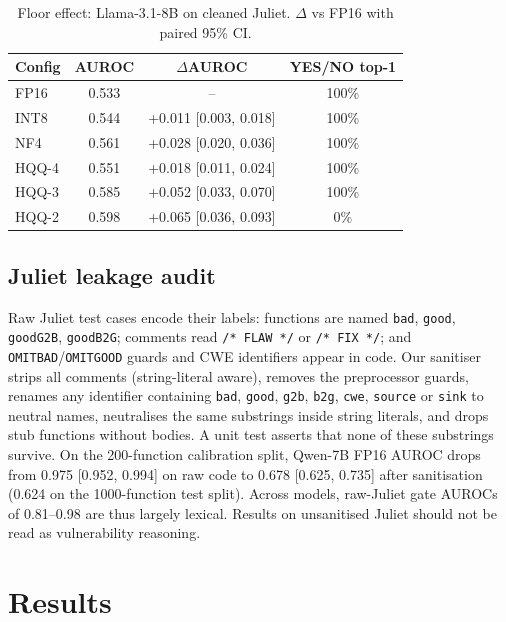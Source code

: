 \documentclass[conference]{IEEEtran}
\begin{document}
\begin{table}[t]
\centering
\caption{Floor effect: Llama-3.1-8B on cleaned Juliet. $\Delta$ vs FP16 with paired 95\% CI.}
\label{tab:floor}
\begin{tabular}{lccc}
\toprule
Config & AUROC & $\Delta$AUROC & YES/NO top-1 \\
\midrule
FP16  & 0.533 & -- & 100\% \\
INT8  & 0.544 & +0.011 [0.003, 0.018] & 100\% \\
NF4   & 0.561 & +0.028 [0.020, 0.036] & 100\% \\
HQQ-4 & 0.551 & +0.018 [0.011, 0.024] & 100\% \\
HQQ-3 & 0.585 & +0.052 [0.033, 0.070] & 100\% \\
HQQ-2 & 0.598 & +0.065 [0.036, 0.093] & 0\% \\
\bottomrule
\end{tabular}
\end{table}

\subsection{Juliet leakage audit}\label{sec:leak}
Raw Juliet test cases encode their labels: functions are named \texttt{bad}, \texttt{good}, \texttt{goodG2B}, \texttt{goodB2G}; comments read \texttt{/* FLAW */} or \texttt{/* FIX */}; and \texttt{OMITBAD}/\texttt{OMITGOOD} guards and CWE identifiers appear in code. Our sanitiser strips all comments (string-literal aware), removes the preprocessor guards, renames any identifier containing \texttt{bad}, \texttt{good}, \texttt{g2b}, \texttt{b2g}, \texttt{cwe}, \texttt{source} or \texttt{sink} to neutral names, neutralises the same substrings inside string literals, and drops stub functions without bodies. A unit test asserts that none of these substrings survive. On the 200-function calibration split, Qwen-7B FP16 AUROC drops from 0.975 [0.952, 0.994] on raw code to 0.678 [0.625, 0.735] after sanitisation (0.624 on the 1000-function test split). Across models, raw-Juliet gate AUROCs of 0.81--0.98 are thus largely lexical. Results on unsanitised Juliet should not be read as vulnerability reasoning.

\section{Results}
\end{document}
